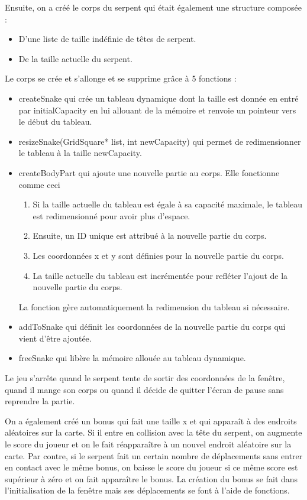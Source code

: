 \documentclass{article}
\begin{document}
Ensuite, on a créé le corps du serpent qui était également une structure composée :
\begin{itemize}
    \item D’une liste de taille indéfinie de têtes de serpent.
    \item De la taille actuelle du serpent.
\end{itemize}
Le corps se crée et s’allonge et se supprime grâce à 5 fonctions :
\begin{itemize}
    \item createSnake qui crée un tableau dynamique dont la taille est donnée en entré par initialCapacity en lui allouant de la mémoire et renvoie un pointeur vers le début du tableau.
    \item resizeSnake(GridSquare* list, int newCapacity) qui permet de redimensionner le tableau à la taille newCapacity.
    \item createBodyPart qui ajoute une nouvelle partie au corps. Elle fonctionne comme ceci
    \begin{enumerate}
        \item Si la taille actuelle du tableau est égale à sa capacité maximale, le tableau est redimensionné pour avoir plus d'espace.
        \item Ensuite, un ID unique est attribué à la nouvelle partie du corps.
        \item Les coordonnées x et y sont définies pour la nouvelle partie du corps.
        \item La taille actuelle du tableau est incrémentée pour refléter l'ajout de la nouvelle partie du corps.
    \end{enumerate}
    La fonction gère automatiquement la redimension du tableau si nécessaire.
    \item addToSnake qui définit les coordonnées de la nouvelle partie du corps qui vient d’être ajoutée.
    \item freeSnake qui libère la mémoire allouée au tableau dynamique.

\end{itemize}
Le jeu s’arrête quand le serpent tente de sortir des coordonnées de la fenêtre, quand il mange son corps ou quand il décide de quitter l’écran de pause sans reprendre la partie.

On a également créé un bonus qui fait une taille x et qui apparaît à des endroits aléatoires sur la carte. Si il entre en collision avec la tête du serpent, on augmente le score du joueur et on le fait réapparaître à un nouvel endroit aléatoire sur la carte. 
Par contre, si le serpent fait un certain nombre de déplacements sans entrer en contact avec le même bonus, on baisse le score du joueur si ce même score est supérieur à zéro et on fait apparaître le bonus. La création du bonus se fait dans l’initialisation de la fenêtre mais ses déplacements se font à l’aide de fonctions.
\end{document}
